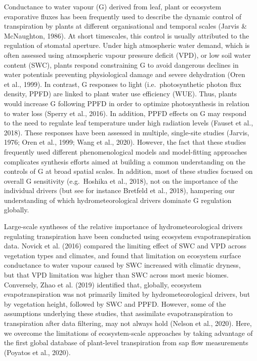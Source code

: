 \documentclass[11pt,twoside]{reedthesis}
\begin{document}
Conductance to water vapour (G) derived from leaf, plant or ecosystem
evaporative fluxes has been frequently used to describe the dynamic
control of transpiration by plants at different organisational and
temporal scales (Jarvis \& McNaughton, 1986). At short timescales, this
control is usually attributed to the regulation of stomatal aperture.
Under high atmospheric water demand, which is often assessed using
atmospheric vapour pressure deficit (VPD), or low soil water content
(SWC), plants respond constraining G to avoid dangerous declines in
water potentials preventing physiological damage and severe dehydration
(Oren et al., 1999). In contrast, G responses to light
(i.e.~photosynthetic photon flux density, PPFD) are linked to plant
water use efficiency (WUE). Thus, plants would increase G following PPFD
in order to optimize photosynthesis in relation to water loss (Sperry et
al., 2016). In addition, PPFD effects on G may respond to the need to
regulate leaf temperature under high radiation levels (Fauset et al.,
2018). These responses have been assessed in multiple, single-site
studies (Jarvis, 1976; Oren et al., 1999; Wang et al., 2020). However,
the fact that these studies frequently used different phenomenological
models and model-fitting approaches complicates synthesis efforts aimed
at building a common understanding on the controls of G at broad spatial
scales. In addition, most of these studies focused on overall G
sensitivity (e.g.~Hoshika et al., 2018), not on the importance of the
individual drivers (but see for instance Bretfeld et al., 2018),
hampering our understanding of which hydrometeorological drivers
dominate G regulation globally.\par

Large-scale syntheses of the relative importance of hydrometeorological
drivers regulating transpiration have been conducted using ecosystem
evapotranspiration data. Novick et al. (2016) compared the limiting
effect of SWC and VPD across vegetation types and climates, and found
that limitation on ecosystem surface conductance to water vapour caused
by SWC increased with climatic dryness, but that VPD limitation was
higher than SWC across most mesic biomes. Conversely, Zhao et al. (2019)
identified that, globally, ecosystem evapotranspiration was not
primarily limited by hydrometeorological drivers, but by vegetation
height, followed by SWC and PPFD. However, some of the assumptions
underlying these studies, that assimilate evapotranspiration to
transpiration after data filtering, may not always hold (Nelson et al.,
2020). Here, we overcome the limitations of ecosystem-scale approaches
by taking advantage of the first global database of plant-level
transpiration from sap flow measurements (Poyatos et al., 2020).\par
\end{document}
